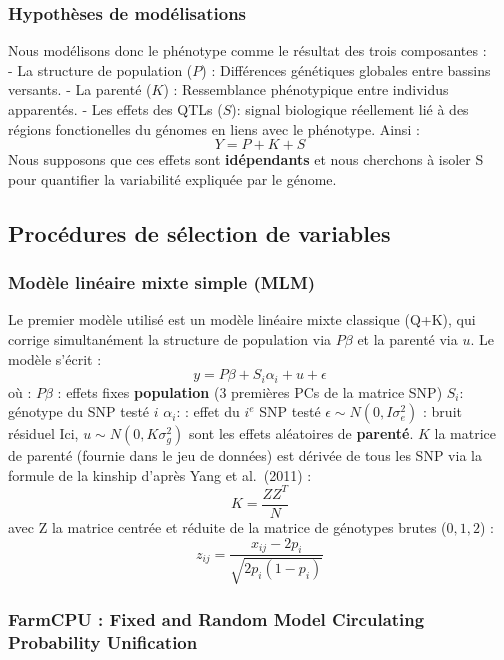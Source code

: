 \documentclass[
  11pt,
  letterpaper,
  DIV=11,
  numbers=noendperiod]{scrartcl}
\begin{document}
\hypertarget{hypothuxe8ses-de-moduxe9lisations}{%
\subsubsection{Hypothèses de
modélisations}\label{hypothuxe8ses-de-moduxe9lisations}}

Nous modélisons donc le phénotype comme le résultat des trois
composantes :\\
- La structure de population (\(P\)) : Différences génétiques globales
entre bassins versants. - La parenté (\(K\)) : Ressemblance phénotypique
entre individus apparentés. - Les effets des QTLs (\(S\)): signal
biologique réellement lié à des régions fonctionelles du génomes en
liens avec le phénotype. Ainsi : \[Y=P+K+S\] Nous supposons que ces
effets sont \textbf{idépendants} et nous cherchons à isoler S pour
quantifier la variabilité expliquée par le génome.

\hypertarget{procuxe9dures-de-suxe9lection-de-variables}{%
\subsection{Procédures de sélection de
variables}\label{procuxe9dures-de-suxe9lection-de-variables}}

\hypertarget{moduxe8le-linuxe9aire-mixte-simple-mlm}{%
\subsubsection{Modèle linéaire mixte simple
(MLM)}\label{moduxe8le-linuxe9aire-mixte-simple-mlm}}

Le premier modèle utilisé est un modèle linéaire mixte classique (Q+K),
qui corrige simultanément la structure de population via \(P\beta\) et
la parenté via \(u\). Le modèle s'écrit :
\[y = P\beta + S_i\alpha_i + u + \epsilon\] où : \(P\beta\) : effets
fixes \textbf{population} (3 premières PCs de la matrice SNP) \(S_i\):
génotype du SNP testé \(i\) \(\alpha_i\): : effet du \(i^e\) SNP testé
\(\epsilon\sim{N(0,I\sigma_{e}^2)}\) : bruit résiduel Ici,
\(u\sim{N(0,K\sigma_{g}^2)}\) sont les effets aléatoires de
\textbf{parenté}. \(K\) la matrice de parenté (fournie dans le jeu de
données) est dérivée de tous les SNP via la formule de la kinship
d'après Yang et al.~(2011) : \[K = \frac{ZZ^T}{N}\] avec Z la matrice
centrée et réduite de la matrice de génotypes brutes (\(0, 1, 2\)) :
\[z_{ij} = \frac{x_{ij} - 2p_i}{\sqrt{2p_i(1 - p_i)}}\]

\hypertarget{farmcpu-fixed-and-random-model-circulating-probability-unification}{%
\subsubsection{FarmCPU : Fixed and Random Model Circulating Probability
Unification}\label{farmcpu-fixed-and-random-model-circulating-probability-unification}}
\end{document}
